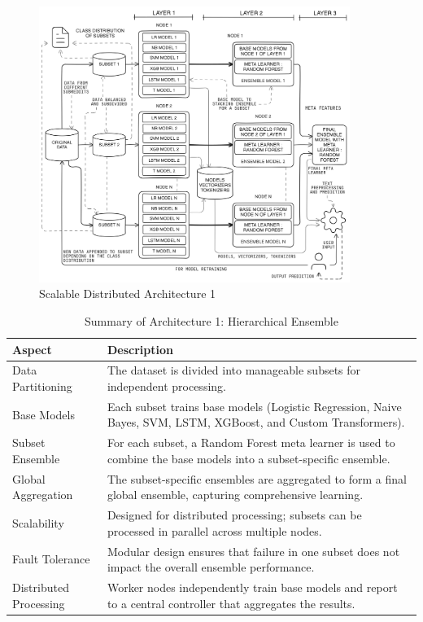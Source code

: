 \begin{figure}[h!]  
    \centering
    \includegraphics[width=0.9\textwidth]{Images/Distributed.png}  
    \caption*{Scalable Distributed Architecture 1}
    \label{lstm archi}  %
\end{figure}

\begin{table}[H]
    \caption*{Summary of Architecture 1: Hierarchical Ensemble}
    \label{tab:arch1}
    \begin{tabularx}{\textwidth}{|p{3cm}|X|}
    \hline
    \textbf{Aspect} & \textbf{Description} \\ \hline
    Data Partitioning & The dataset is divided into manageable subsets for independent processing. \\ \hline
    Base Models & Each subset trains base models (Logistic Regression, Naive Bayes, SVM, LSTM, XGBoost, and Custom Transformers). \\ \hline
    Subset Ensemble & For each subset, a Random Forest meta learner is used to combine the base models into a subset-specific ensemble. \\ \hline
    Global Aggregation & The subset-specific ensembles are aggregated to form a final global ensemble, capturing comprehensive learning. \\ \hline
    Scalability & Designed for distributed processing; subsets can be processed in parallel across multiple nodes. \\ \hline
    Fault Tolerance & Modular design ensures that failure in one subset does not impact the overall ensemble performance. \\ \hline
    Distributed Processing & Worker nodes independently train base models and report to a central controller that aggregates the results. \\ \hline
    \end{tabularx}
\end{table}
    
